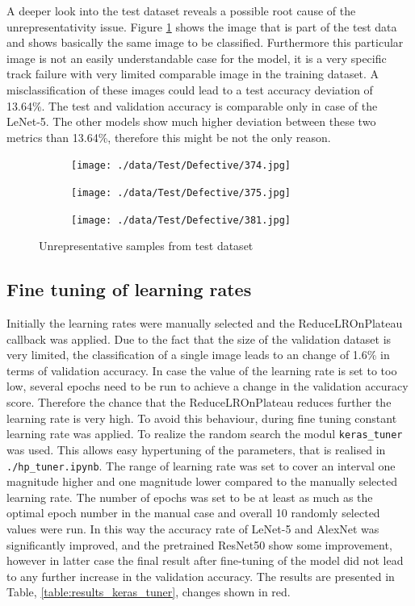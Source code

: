 \documentclass[10pt, final]{article}
\begin{document}
A deeper look into the test dataset reveals a possible root cause of the unrepresentativity issue.
Figure \ref{fig:unrepr_test} shows the image that is part of the test data and shows basically the same image to be classified.
Furthermore this particular image is not an easily understandable case for the model, it is a very specific track failure with
very limited comparable image in the training dataset.
A misclassification of these images could lead to a test accuracy deviation of 13.64\%.
The test and validation accuracy is comparable only in case of the LeNet-5.
The other models show much higher deviation between these two metrics than 13.64\%, therefore this might be not the only reason.

\begin{figure}[!ht]
	\centering
	\begin{subfigure}{0.3\textwidth}
		\centering
		\texttt{[image: ./data/Test/Defective/374.jpg]}
	\end{subfigure}
	\begin{subfigure}{0.3\textwidth}
		\centering
		\texttt{[image: ./data/Test/Defective/375.jpg]}
	\end{subfigure}
	\begin{subfigure}{0.3\textwidth}
		\centering
		\texttt{[image: ./data/Test/Defective/381.jpg]}
	\end{subfigure}
	\caption{Unrepresentative samples from test dataset}
	\label{fig:unrepr_test}
\end{figure}

\subsection{Fine tuning of learning rates}
Initially the learning rates were manually selected and the ReduceLROnPlateau callback was applied.
Due to the fact that the size of the validation dataset is very limited, the classification of a single image leads
to an change of 1.6\% in terms of validation accuracy.
In case the value of the learning rate is set to too low, several epochs need to be run to achieve a change in the
validation accuracy score.
Therefore the chance that the ReduceLROnPlateau reduces further the learning rate is very high.
To avoid this behaviour, during fine tuning constant learning rate was applied.
To realize the random search the modul \lstinline{keras_tuner} was used.
This allows easy hypertuning of the parameters, that is realised in \lstinline{./hp_tuner.ipynb}.
The range of learning rate was set to cover an interval one magnitude higher and one magnitude lower compared to the
manually selected learning rate.
The number of epochs was set to be at least as much as the optimal epoch number in the manual case and overall
10 randomly selected values were run.
In this way the accuracy rate of LeNet-5 and AlexNet was significantly improved, and the pretrained ResNet50 show some
improvement, however in latter case the final result after fine-tuning of the model did not lead to any further increase
in the validation accuracy.
The results are presented in Table, \ref{table:results_keras_tuner}, changes shown in red.
\end{document}
